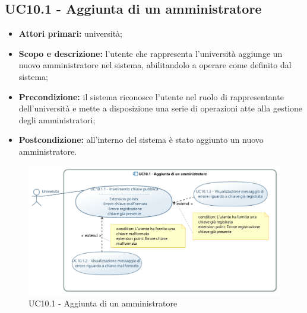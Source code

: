 \documentclass[AnalisiDeiRequisiti.tex]{subfiles}
\begin{document}
\subsection{UC10.1 - Aggiunta di un amministratore}
\begin{itemize}
	\item \textbf{Attori primari:} università;
	\item \textbf{Scopo e descrizione:} l'utente che rappresenta l'università aggiunge un nuovo amministratore nel sistema, abilitandolo a operare come definito dal sistema;
	\item \textbf{Precondizione:} il sistema riconosce l'utente nel ruolo di rappresentante dell'università e mette a disposizione una serie di operazioni atte alla gestione degli amministratori; 
	\item \textbf{Postcondizione:} all'interno del sistema è stato aggiunto un nuovo amministratore.
\end{itemize}

\begin{figure}[H]
	\centering
	\includegraphics[width=1.0\linewidth]{UC10_1.jpg}
	\caption{UC10.1 - Aggiunta di un amministratore}
	\label{fig:UC10.1 - Aggiunta di un amministratore}
\end{figure}
\end{document}
